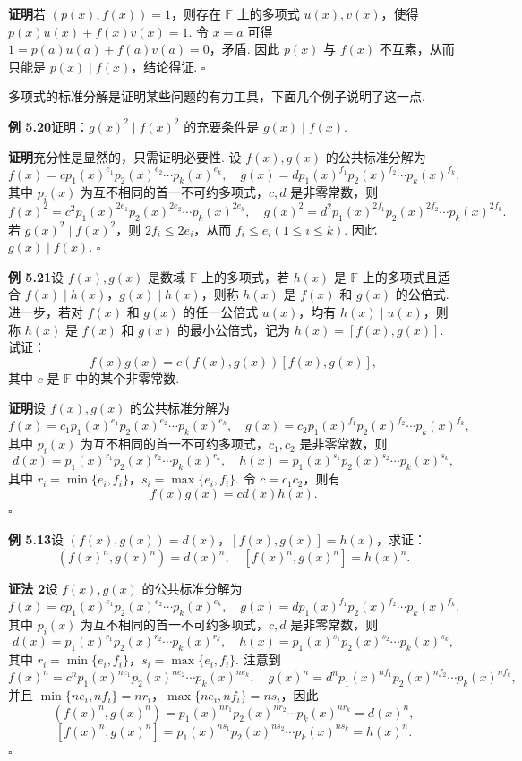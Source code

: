 \documentclass[UTF8,12pt,a4paper,fontset=fandol]{ctexart}
\begin{document}
\noindent\textbf{证明}\quad 若 $(p(x),f(x))=1$，则存在 $\mathbb{F}$ 上的多项式 $u(x),v(x)$，使得 $p(x)u(x)+f(x)v(x)=1$. 令 $x=a$ 可得 $1=p(a)u(a)+f(a)v(a)=0$，矛盾. 因此 $p(x)$ 与 $f(x)$ 不互素，从而只能是 $p(x)\mid f(x)$，结论得证. \hfill $\square$

多项式的标准分解是证明某些问题的有力工具，下面几个例子说明了这一点.

\noindent\textbf{例 5.20}\quad 证明：$g(x)^2\mid f(x)^2$ 的充要条件是 $g(x)\mid f(x)$.

\noindent\textbf{证明}\quad 充分性是显然的，只需证明必要性. 设 $f(x),g(x)$ 的公共标准分解为
\[
f(x)=cp_1(x)^{e_1}p_2(x)^{e_2}\cdots p_k(x)^{e_k},\quad
g(x)=dp_1(x)^{f_1}p_2(x)^{f_2}\cdots p_k(x)^{f_k},
\]
其中 $p_i(x)$ 为互不相同的首一不可约多项式，$c,d$ 是非零常数，则
\[
f(x)^2=c^2p_1(x)^{2e_1}p_2(x)^{2e_2}\cdots p_k(x)^{2e_k},\quad
g(x)^2=d^2p_1(x)^{2f_1}p_2(x)^{2f_2}\cdots p_k(x)^{2f_k}.
\]
若 $g(x)^2\mid f(x)^2$，则 $2f_i\le2e_i$，从而 $f_i\le e_i(1\le i\le k)$. 因此 $g(x)\mid f(x)$. \hfill $\square$

\noindent\textbf{例 5.21}\quad 设 $f(x),g(x)$ 是数域 $\mathbb{F}$ 上的多项式，若 $h(x)$ 是 $\mathbb{F}$ 上的多项式且适合 $f(x)\mid h(x)$，$g(x)\mid h(x)$，则称 $h(x)$ 是 $f(x)$ 和 $g(x)$ 的公倍式. 进一步，若对 $f(x)$ 和 $g(x)$ 的任一公倍式 $u(x)$，均有 $h(x)\mid u(x)$，则称 $h(x)$ 是 $f(x)$ 和 $g(x)$ 的最小公倍式，记为 $h(x)=[f(x),g(x)]$. 试证：
\[
f(x)g(x)=c(f(x),g(x))[f(x),g(x)],
\]
其中 $c$ 是 $\mathbb{F}$ 中的某个非零常数.

\noindent\textbf{证明}\quad 设 $f(x),g(x)$ 的公共标准分解为
\[
f(x)=c_1p_1(x)^{e_1}p_2(x)^{e_2}\cdots p_k(x)^{e_k},\quad
g(x)=c_2p_1(x)^{f_1}p_2(x)^{f_2}\cdots p_k(x)^{f_k},
\]
其中 $p_i(x)$ 为互不相同的首一不可约多项式，$c_1,c_2$ 是非零常数，则
\[
d(x)=p_1(x)^{r_1}p_2(x)^{r_2}\cdots p_k(x)^{r_k},\quad
h(x)=p_1(x)^{s_1}p_2(x)^{s_2}\cdots p_k(x)^{s_k},
\]
其中 $r_i=\min\{e_i,f_i\}$，$s_i=\max\{e_i,f_i\}$. 令 $c=c_1c_2$，则有
\[
f(x)g(x)=cd(x)h(x).
\]
\hfill $\square$

\noindent\textbf{例 5.13}\quad 设 $(f(x),g(x))=d(x)$，$[f(x),g(x)]=h(x)$，求证：
\[
(f(x)^n,g(x)^n)=d(x)^n,\quad [f(x)^n,g(x)^n]=h(x)^n.
\]

\noindent\textbf{证法 2}\quad 设 $f(x),g(x)$ 的公共标准分解为
\[
f(x)=cp_1(x)^{e_1}p_2(x)^{e_2}\cdots p_k(x)^{e_k},\quad
g(x)=dp_1(x)^{f_1}p_2(x)^{f_2}\cdots p_k(x)^{f_k},
\]
其中 $p_i(x)$ 为互不相同的首一不可约多项式，$c,d$ 是非零常数，则
\[
d(x)=p_1(x)^{r_1}p_2(x)^{r_2}\cdots p_k(x)^{r_k},\quad
h(x)=p_1(x)^{s_1}p_2(x)^{s_2}\cdots p_k(x)^{s_k},
\]
其中 $r_i=\min\{e_i,f_i\}$，$s_i=\max\{e_i,f_i\}$. 注意到
\[
f(x)^n=c^np_1(x)^{ne_1}p_2(x)^{ne_2}\cdots p_k(x)^{ne_k},\quad
g(x)^n=d^np_1(x)^{nf_1}p_2(x)^{nf_2}\cdots p_k(x)^{nf_k},
\]
并且 $\min\{ne_i,nf_i\}=nr_i$，$\max\{ne_i,nf_i\}=ns_i$，因此
\[
(f(x)^n,g(x)^n)=p_1(x)^{nr_1}p_2(x)^{nr_2}\cdots p_k(x)^{nr_k}=d(x)^n,
\]
\[
[f(x)^n,g(x)^n]=p_1(x)^{ns_1}p_2(x)^{ns_2}\cdots p_k(x)^{ns_k}=h(x)^n.
\]
\hfill $\square$
\end{document}
